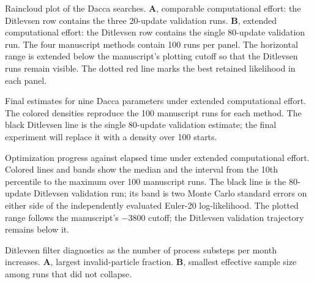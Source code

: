 
\caption{Raincloud plot of the Dacca searches. \textbf{A}, comparable
computational effort: the Ditlevsen row contains the three 20-update validation
runs. \textbf{B}, extended computational effort: the Ditlevsen row contains the
single 80-update validation run. The four manuscript methods contain 100 runs
per panel. The horizontal range is extended below the manuscript's plotting
cutoff so that the Ditlevsen runs remain visible. The dotted red line marks the
best retained likelihood in each panel.}

\caption{Final estimates for nine Dacca parameters under extended computational
effort. The colored densities reproduce the 100 manuscript runs for each
method. The black Ditlevsen line is the single 80-update validation estimate;
the final experiment will replace it with a density over 100 starts.}

\caption{Optimization progress against elapsed time under extended
computational effort. Colored lines and bands show the median and the interval
from the 10th percentile to the maximum over 100 manuscript runs. The black
line is the 80-update Ditlevsen validation run; its band is two Monte Carlo
standard errors on either side of the independently evaluated Euler-20
log-likelihood. The plotted range follows the manuscript's $-3800$ cutoff; the
Ditlevsen validation trajectory remains below it.}

\caption{Ditlevsen filter diagnostics as the number of process substeps per
month increases. \textbf{A}, largest invalid-particle fraction. \textbf{B},
smallest effective sample size among runs that did not collapse.}
